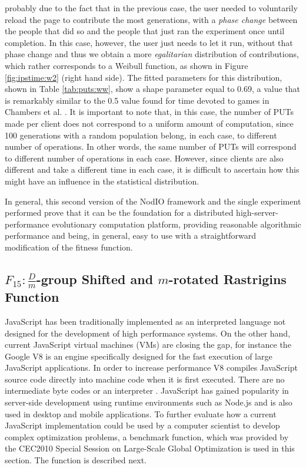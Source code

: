 \documentclass[journal,onecolumn]{IEEEtran}
\begin{document}
probably due to the fact that in the previous case, the user needed to
voluntarily reload the page to contribute the most generations, with a
{\em phase change} between the people that did so and the people that
just ran the experiment once until completion. In this case, however, the
user just needs to let it run, without that phase change and thus we obtain a
more {\em egalitarian} distribution of contributions, which rather
corresponds to a Weibull function, as shown in Figure
\ref{fig:ipstime:w2} (right hand side). The fitted parameters for this
distribution, shown in Table \ref{tab:puts:ww}, show a shape parameter
equal to 0.69, a value that is remarkably similar to the 0.5 value
found for time devoted to games in Chambers et
al. \cite{chambers2005measurement}. It is important to note that, in
this case, the number of PUTs made per client does not correspond to a
uniform amount of computation, since 100 generations with a random
population belong, in each case, to different number of
operations. In other words, the same number of PUTs will correspond to
different number of operations in each case. However, since clients
are also different and take a different time in each case, it is
difficult to ascertain how this might have an influence in the
statistical distribution.

In general, this second version of the {\sf NodIO} framework and the
single experiment performed prove that it can be the foundation for a distributed
high-server-performance evolutionary computation platform,
providing reasonable algorithmic performance and being, in general,
easy to use with a straightforward modification of the fitness
function. 


\subsection{$F_{15}:\frac{D}{m}$-group Shifted and $m$-rotated Rastrigins Function}
JavaScript has been traditionally implemented as an interpreted
language not designed for the development of high performance
systems. On the other hand, current JavaScript  
virtual machines (VMs) are closing the gap, for instance the Google V8 
is an engine specifically designed for the fast execution of 
large JavaScript applications. In order to increase performance
V8 compiles JavaScript source code directly into machine code when it is first executed. 
There are no intermediate byte codes or an interpreter \cite{Gray:2009:GCM:1610564.1610565}.
JavaScript has gained popularity in server-side development using runtime
environments such as Node.js and is also used in desktop and mobile applications. 
To further evaluate how a current JavaScript implementation could be used by a
computer scientist to develop complex optimization problems,
a benchmark function, which was provided by the CEC2010 Special Session on
Large-Scale Global Optimization \cite{tang2007benchmark} is used in this section. 
The function is described next.
\end{document}
